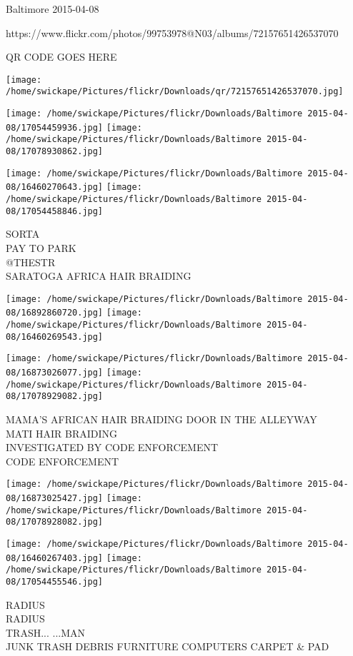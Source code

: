 \documentclass[10pt,letterpaper]{article}
\begin{document}
Baltimore 2015-04-08

https://www.flickr.com/photos/99753978@N03/albums/72157651426537070

QR CODE GOES HERE

\texttt{[image: /home/swickape/Pictures/flickr/Downloads/qr/72157651426537070.jpg]}
\pagebreak

\texttt{[image: /home/swickape/Pictures/flickr/Downloads/Baltimore 2015-04-08/17054459936.jpg]}
\texttt{[image: /home/swickape/Pictures/flickr/Downloads/Baltimore 2015-04-08/17078930862.jpg]}

\texttt{[image: /home/swickape/Pictures/flickr/Downloads/Baltimore 2015-04-08/16460270643.jpg]}
\texttt{[image: /home/swickape/Pictures/flickr/Downloads/Baltimore 2015-04-08/17054458846.jpg]}

SORTA\\
PAY TO PARK\\
@THESTR\\
SARATOGA AFRICA HAIR BRAIDING\\
\pagebreak

\texttt{[image: /home/swickape/Pictures/flickr/Downloads/Baltimore 2015-04-08/16892860720.jpg]}
\texttt{[image: /home/swickape/Pictures/flickr/Downloads/Baltimore 2015-04-08/16460269543.jpg]}

\texttt{[image: /home/swickape/Pictures/flickr/Downloads/Baltimore 2015-04-08/16873026077.jpg]}
\texttt{[image: /home/swickape/Pictures/flickr/Downloads/Baltimore 2015-04-08/17078929082.jpg]}

MAMA'S AFRICAN HAIR BRAIDING DOOR IN THE ALLEYWAY\\
MATI HAIR BRAIDING\\
INVESTIGATED BY CODE ENFORCEMENT\\
CODE ENFORCEMENT\\
\pagebreak

\texttt{[image: /home/swickape/Pictures/flickr/Downloads/Baltimore 2015-04-08/16873025427.jpg]}
\texttt{[image: /home/swickape/Pictures/flickr/Downloads/Baltimore 2015-04-08/17078928082.jpg]}

\texttt{[image: /home/swickape/Pictures/flickr/Downloads/Baltimore 2015-04-08/16460267403.jpg]}
\texttt{[image: /home/swickape/Pictures/flickr/Downloads/Baltimore 2015-04-08/17054455546.jpg]}

RADIUS\\
RADIUS\\
TRASH... ...MAN\\
JUNK TRASH DEBRIS FURNITURE COMPUTERS CARPET \& PAD\\
\pagebreak
\end{document}
